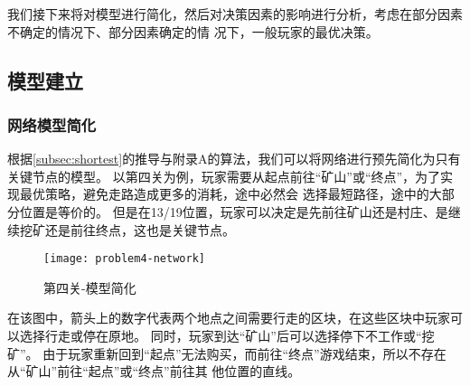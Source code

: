 \documentclass[bwprint]{cumcmthesis} %
\begin{document}
我们接下来将对模型进行简化，然后对决策因素的影响进行分析，考虑在部分因素不确定的情况下、部分因素确定的情
况下，一般玩家的最优决策。

\subsection{模型建立}


\subsubsection{网络模型简化}
\label{subsub:simplify}

根据\ref{subsec:shortest}的推导与附录A的算法，我们可以将网络进行预先简化为只有关键节点的模型。
以第四关为例，玩家需要从起点前往“矿山”或“终点”，为了实现最优策略，避免走路造成更多的消耗，途中必然会
选择最短路径，途中的大部分位置是等价的。
但是在13/19位置，玩家可以决定是先前往矿山还是村庄、是继续挖矿还是前往终点，这也是关键节点。


\begin{figure}[!h]
    \centering
    \texttt{[image: problem4-network]}
    \caption{第四关-模型简化}
    \label{fig:example-network}
\end{figure}

在该图中，箭头上的数字代表两个地点之间需要行走的区块，在这些区块中玩家可以选择行走或停在原地。
同时，玩家到达“矿山”后可以选择停下不工作或“挖矿”。
由于玩家重新回到“起点”无法购买，而前往“终点”游戏结束，所以不存在从“矿山”前往“起点”或“终点”前往其
他位置的直线。


\end{document}

